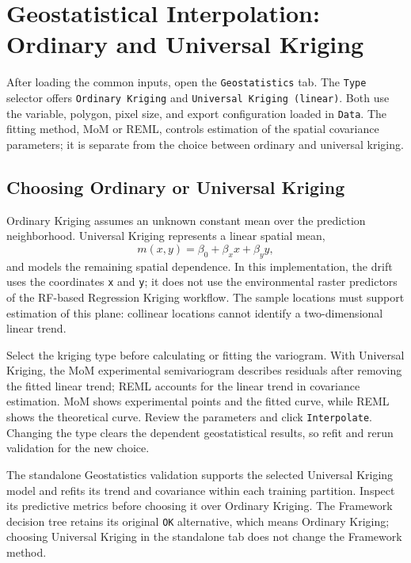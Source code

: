 \documentclass[11pt,a4paper]{article}
\begin{document}
\section{Geostatistical Interpolation: Ordinary and Universal Kriging}

After loading the common inputs, open the \texttt{Geostatistics} tab. The \texttt{Type} selector offers \texttt{Ordinary Kriging} and \texttt{Universal Kriging (linear)}. Both use the variable, polygon, pixel size, and export configuration loaded in \texttt{Data}. The fitting method, MoM or REML, controls estimation of the spatial covariance parameters; it is separate from the choice between ordinary and universal kriging.

\subsection{Choosing Ordinary or Universal Kriging}
\label{sec:universal-kriging}

Ordinary Kriging assumes an unknown constant mean over the prediction neighborhood. Universal Kriging represents a linear spatial mean,
\[
    m(x,y)=\beta_0+\beta_x x+\beta_y y,
\]
and models the remaining spatial dependence. In this implementation, the drift uses the coordinates \texttt{x} and \texttt{y}; it does not use the environmental raster predictors of the RF-based Regression Kriging workflow. The sample locations must support estimation of this plane: collinear locations cannot identify a two-dimensional linear trend.

Select the kriging type before calculating or fitting the variogram. With Universal Kriging, the MoM experimental semivariogram describes residuals after removing the fitted linear trend; REML accounts for the linear trend in covariance estimation. MoM shows experimental points and the fitted curve, while REML shows the theoretical curve. Review the parameters and click \texttt{Interpolate}. Changing the type clears the dependent geostatistical results, so refit and rerun validation for the new choice.

The standalone Geostatistics validation supports the selected Universal Kriging model and refits its trend and covariance within each training partition. Inspect its predictive metrics before choosing it over Ordinary Kriging. The Framework decision tree retains its original \texttt{OK} alternative, which means Ordinary Kriging; choosing Universal Kriging in the standalone tab does not change the Framework method.
\end{document}
